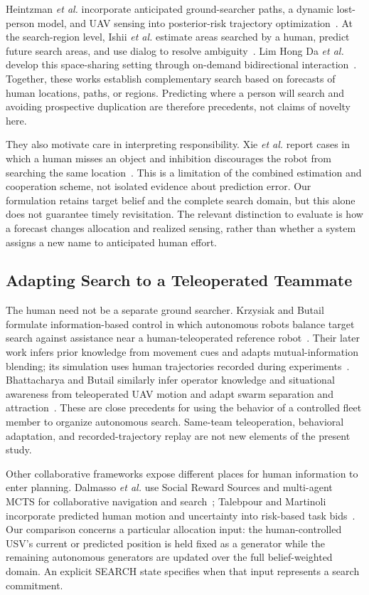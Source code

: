 \documentclass[conference]{IEEEtran}
\begin{document}
Heintzman \emph{et al.} incorporate anticipated ground-searcher paths, a dynamic lost-person model, and UAV sensing into posterior-risk trajectory optimization~\cite{Heintzman2021Anticipatory}. At the search-region level, Ishii \emph{et al.} estimate areas searched by a human, predict future search areas, and use dialog to resolve ambiguity~\cite{Ishii2023Enhancing}. Lim Hong Da \emph{et al.} develop this space-sharing setting through on-demand bidirectional interaction~\cite{LimMiuraHayashi2025SpaceSharing}. Together, these works establish complementary search based on forecasts of human locations, paths, or regions. Predicting where a person will search and avoiding prospective duplication are therefore precedents, not claims of novelty here.

They also motivate care in interpreting responsibility. Xie \emph{et al.} report cases in which a human misses an object and inhibition discourages the robot from searching the same location~\cite{Xie2011Intention}. This is a limitation of the combined estimation and cooperation scheme, not isolated evidence about prediction error. Our formulation retains target belief and the complete search domain, but this alone does not guarantee timely revisitation. The relevant distinction to evaluate is how a forecast changes allocation and realized sensing, rather than whether a system assigns a new name to anticipated human effort.

\subsection{Adapting Search to a Teleoperated Teammate}
The human need not be a separate ground searcher. Krzysiak and Butail formulate information-based control in which autonomous robots balance target search against assistance near a human-teleoperated reference robot~\cite{KrzysiakButail2022Information}. Their later work infers prior knowledge from movement cues and adapts mutual-information blending; its simulation uses human trajectories recorded during experiments~\cite{KrzysiakButail2025Movement}. Bhattacharya and Butail similarly infer operator knowledge and situational awareness from teleoperated UAV motion and adapt swarm separation and attraction~\cite{bb2025}. These are close precedents for using the behavior of a controlled fleet member to organize autonomous search. Same-team teleoperation, behavioral adaptation, and recorded-trajectory replay are not new elements of the present study.

Other collaborative frameworks expose different places for human information to enter planning. Dalmasso \emph{et al.} use Social Reward Sources and multi-agent MCTS for collaborative navigation and search~\cite{b5}; Talebpour and Martinoli incorporate predicted human motion and uncertainty into risk-based task bids~\cite{TalebpourMartinoli2018IROS}. Our comparison concerns a particular allocation input: the human-controlled USV's current or predicted position is held fixed as a generator while the remaining autonomous generators are updated over the full belief-weighted domain. An explicit SEARCH state specifies when that input represents a search commitment.
\end{document}
